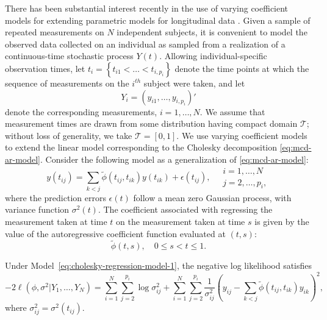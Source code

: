 There has been substantial interest recently in the use of varying coefficient models for extending parametric models for longitudinal data \citep{noh2010sparse,csenturk2013modeling,csenturk2008generalized,chiang2001smoothing,hoover1998nonparametric,fan1999statistical}. Given a sample of repeated measurements on $N$ independent subjects, it is convenient to model the observed data collected on an individual as sampled from a realization of a continuous-time stochastic process $Y\left(t\right)$. Allowing individual-specific observation times, let $t_{i} = \left\{t_{i1} <  \dots < t_{i,p_i}\right\}$ denote the time points at which the sequence of measurements on the $i^{th}$ subject were taken, and let
\[
Y_i = \left(y_{i1}, \dots, y_{i,p_i}\right)'
\]
\noindent
denote the corresponding measurements, $i = 1, \dots, N$. We assume that measurement times are drawn from some distribution having compact domain $\mathcal{T}$; without loss of generality, we take $\mathcal{T} = \left[0,1\right]$. We use varying coefficient models to extend the linear model corresponding to the Cholesky decomposition \eqref{eq:mcd-ar-model}. Consider the following model as a generalization of \eqref{eq:mcd-ar-model}: 
\begin{equation}  \label{eq:cholesky-regression-model-1} 
y\left(t_{ij} \right)  = \sum_{k < j} \tilde{\phi}\left(t_{ij} ,t_{ik}\right) y\left(t_{ik}\right) + \epsilon\left({t_{ij}}\right), \quad \begin{array}{l} i = 1, \dots, N\\ j = 2, \dots, p_i,\end{array}
\end{equation}
\noindent
where the prediction errors $\epsilon\left(t\right)$ follow a mean zero Gaussian process, with variance function $\sigma^2\left(t\right)$. The coefficient associated with regressing the measurement taken at time $t$ on the measurement taken at time $s$ is given by the value of the autoregressive coefficient function evaluated at $\left(t,s\right)$:
\[
\tilde{\phi}\left(t,s\right), \quad 0 \le s < t \le 1.
\]

Under Model~\eqref{eq:cholesky-regression-model-1}, the negative log likelihood satisfies 
\begin{equation} \label{eq:full-joint-likelihood}
-2\ell\left(\phi, \sigma^2 \vert Y_1,\dots, Y_N \right) = \sum_{i=1}^N \sum_{j=2}^{p_i} \log \sigma_{ij}^2+  \sum_{i=1}^N \sum_{j=2}^{p_i} \frac{1}{\sigma^{2}_{ij}}\left( y_{ij} - \sum_{k<j} \tilde{\phi}\left(t_{ij}, t_{ik}\right) y_{ik}  \right)^2,
\end{equation}
\noindent
where $\sigma_{ij}^2 = \sigma^2\left(t_{ij}\right)$.
\bigskip


